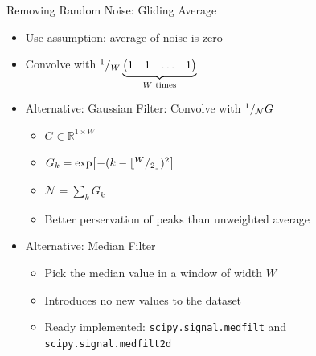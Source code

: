 \begin{frame}{Removing Random Noise: Gliding Average}
%
\begin{itemize}
\item Use assumption: average of noise is zero
\item Convolve with $
	{}^{1}/_{W} 
	\underbrace{
	\begin{pmatrix}
	1 & 1 & \ldots & 1
	\end{pmatrix}
	}_{W \text{ times}}
	$
\item Alternative: Gaussian Filter: Convolve with ${}^{1}/_{\mathcal{N}} G$
	\begin{itemize}
	\item $G \in \mathbb{R}^{1 \times W}$
	\item $G_k = \exp[-(k - \lfloor{}^{W}/_{2}\rfloor)^2]$
	\item $\mathcal{N} = \sum_k G_k$
	\item Better perservation of peaks than unweighted average
	\end{itemize}
\item Alternative: Median Filter
	\begin{itemize}
	\item Pick the median value in a window of width $W$
	\item Introduces no new values to the dataset
	\item Ready implemented: \texttt{scipy.signal.medfilt} and \texttt{scipy.signal.medfilt2d}
	\end{itemize}
\end{itemize}
%
\end{frame}


